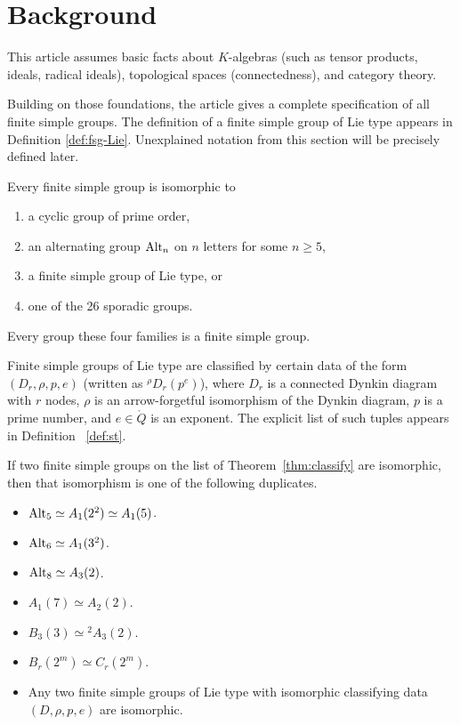 \section{Background}

This article assumes basic facts about $K$-algebras (such as tensor
products, ideals, radical ideals),
topological spaces (connectedness), and category theory.

Building on those foundations, the article gives a complete
specification of all finite simple groups.
The definition of a finite simple group of Lie type appears in
Definition \ref{def:fsg-Lie}.
Unexplained notation from this section will be precisely
defined later.

\begin{theorem}\label{thm:classify}
  Every finite simple group is isomorphic to 
\begin{enumerate}
\item a cyclic group of prime order,
\item an alternating group $\text{Alt}_n$ on $n$ letters for some $n\ge 5$,
\item a finite simple group of Lie type, or
\item one of the 26 sporadic groups.
\end{enumerate}
Every group these four families is a finite
simple group.
\end{theorem}

  Finite simple groups of Lie type are classified by certain data of
  the form $(D_r,\rho,p,e)$ (written as ${}^{\rho}D_r(p^e)$), where
  $D_r$ is a connected Dynkin diagram with $r$ nodes, $\rho$ is an
  arrow-forgetful isomorphism of the Dynkin diagram, $p$ is a prime
  number, and $e \in \ring{Q}$ is an exponent.  The explicit list of
  such tuples appears in Definition ~\ref{def:st}.


\begin{theorem}\label{thm:duplicate}
  If two finite simple groups on the
  list of Theorem~\ref{thm:classify} are isomorphic, then that
  isomorphism is one of the following duplicates.
  \begin{itemize}
  \item $\text{Alt}_5 \simeq A_1(2^2) \simeq A_1(5)$.
  \item $\text{Alt}_6 \simeq A_1(3^2)$.
  \item $\text{Alt}_8 \simeq A_3(2)$.
  \item $A_1(7) \simeq A_2(2)$.
  \item $B_3(3) \simeq {}^2A_3(2)$.
  \item $B_r(2^m) \simeq C_r(2^m)$.
  \item Any two finite simple groups of Lie type with
    isomorphic classifying data $(D,\rho,p,e)$ are isomorphic.
  \end{itemize}
\end{theorem}

